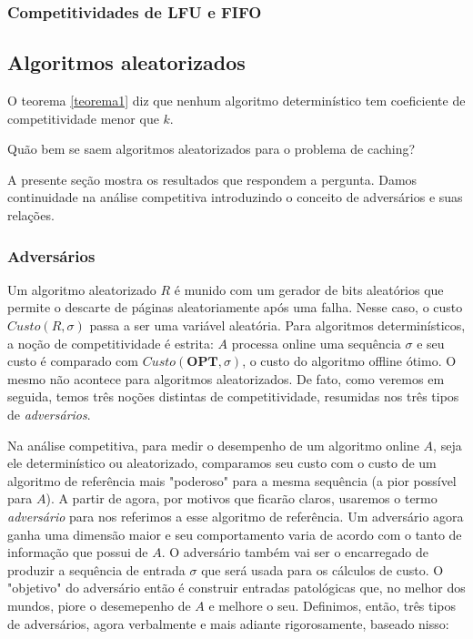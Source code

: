 \subsubsection{Competitividades de \textbf{LFU} e \textbf{FIFO}}

\subsection{Algoritmos aleatorizados}

O teorema \ref{teorema1} diz que nenhum algoritmo determinístico tem coeficiente de competitividade menor que \(k\). 

\begin{question}
Quão bem se saem algoritmos aleatorizados para o problema de caching?
\end{question}

A presente seção mostra os resultados que respondem a pergunta. Damos continuidade na análise competitiva introduzindo o conceito de adversários e suas relações.

\subsubsection{Adversários}

Um algoritmo aleatorizado \(R\) é munido com um gerador de bits aleatórios que permite o descarte de páginas aleatoriamente após uma falha. Nesse caso, o custo \(Custo(R,\sigma)\) passa a ser uma variável aleatória. Para algoritmos determinísticos, a noção de competitividade é estrita: \(A\) processa online uma sequência \(\sigma\) e seu custo é comparado com \(Custo(\textbf{OPT}, \sigma)\), o custo do algoritmo offline ótimo. O mesmo não acontece para algoritmos aleatorizados. De fato, como veremos em seguida, temos três noções distintas de competitividade, resumidas nos três tipos de \textit{adversários}. 

Na análise competitiva, para medir o desempenho de um algoritmo online \(A\), seja ele determinístico ou aleatorizado, comparamos seu custo com o custo de um algoritmo de referência mais "poderoso" para a mesma sequência (a pior possível para \(A\)). 
A partir de agora, por motivos que ficarão claros, usaremos o termo \textit{adversário} para nos referimos a esse algoritmo de referência. Um adversário agora ganha uma dimensão maior e seu comportamento varia de acordo com o tanto de informação que possui de \(A\). O adversário também vai ser o encarregado de produzir a sequência de entrada \(\sigma\) que será usada para os cálculos de custo. O "objetivo" do adversário então é construir entradas patológicas que, no melhor dos mundos, piore o desemepenho de \(A\) e melhore o seu. Definimos, então, três tipos de adversários, agora verbalmente e mais adiante rigorosamente, baseado nisso:

